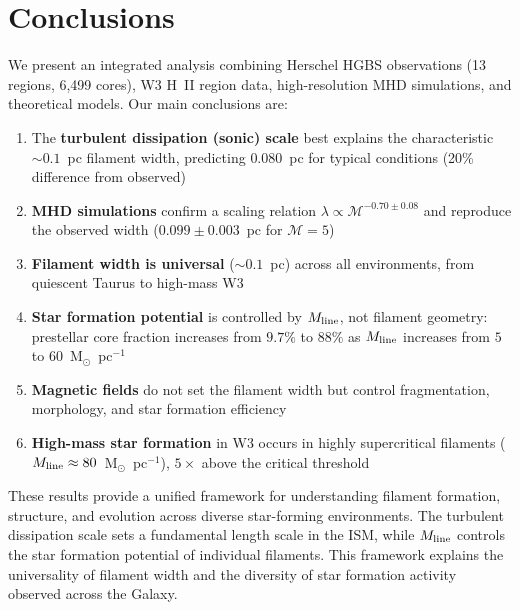 \documentclass{mnras}
\begin{document}
\section{Conclusions}
\label{sec:conclusions}

We present an integrated analysis combining Herschel HGBS observations (13 regions, 6,499 cores), W3 H~II region data, high-resolution MHD simulations, and theoretical models. Our main conclusions are:

\begin{enumerate}
  \item The \textbf{turbulent dissipation (sonic) scale} best explains the characteristic $\sim 0.1$~pc filament width, predicting $0.080$~pc for typical conditions (20\% difference from observed)

  \item \textbf{MHD simulations} confirm a scaling relation $\lambda \propto \mathcal{M}^{-0.70 \pm 0.08}$ and reproduce the observed width ($0.099 \pm 0.003$~pc for $\mathcal{M} = 5$)

  \item \textbf{Filament width is universal} ($\sim 0.1$~pc) across all environments, from quiescent Taurus to high-mass W3

  \item \textbf{Star formation potential} is controlled by $M_{\rm line}$, not filament geometry: prestellar core fraction increases from $9.7\%$ to $88\%$ as $M_{\rm line}$ increases from $5$ to $60$~M$_\odot$~pc$^{-1}$

  \item \textbf{Magnetic fields} do not set the filament width but control fragmentation, morphology, and star formation efficiency

  \item \textbf{High-mass star formation} in W3 occurs in highly supercritical filaments ($M_{\rm line} \approx 80$~M$_\odot$~pc$^{-1}$), $5\times$ above the critical threshold
\end{enumerate}

These results provide a unified framework for understanding filament formation, structure, and evolution across diverse star-forming environments. The turbulent dissipation scale sets a fundamental length scale in the ISM, while $M_{\rm line}$ controls the star formation potential of individual filaments. This framework explains the universality of filament width and the diversity of star formation activity observed across the Galaxy.
\end{document}
